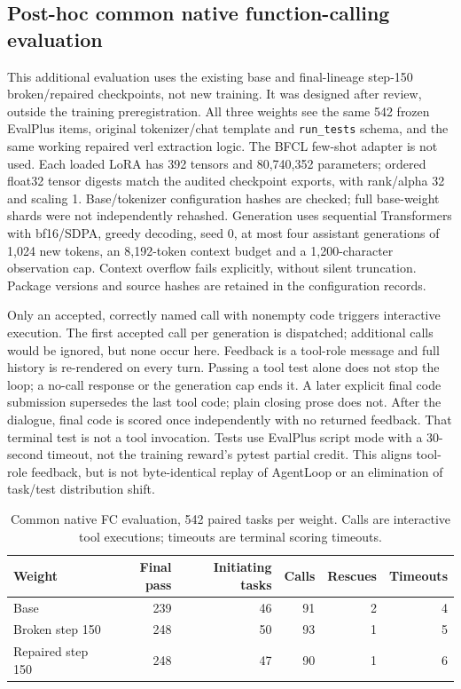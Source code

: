 \subsection{Post-hoc common native function-calling evaluation}
\label{app:nativefc}

This additional evaluation uses the existing base and final-lineage step-150
broken/repaired checkpoints, not new training. It was designed after review, outside
the training preregistration. All three weights see the same 542 frozen EvalPlus
items, original tokenizer/chat template and \texttt{run\_tests} schema, and the same
working repaired verl extraction logic. The BFCL few-shot adapter is not used.
Each loaded LoRA has 392 tensors and 80,740,352 parameters; ordered float32 tensor
digests match the audited checkpoint exports, with rank/alpha 32 and scaling 1.
Base/tokenizer configuration hashes are checked; full base-weight shards were not
independently rehashed. Generation uses sequential Transformers with bf16/SDPA,
greedy decoding, seed 0, at most four assistant generations of 1,024 new tokens,
an 8,192-token context budget and a 1,200-character observation cap. Context overflow
fails explicitly, without silent truncation. Package versions and source hashes
are retained in the configuration records.

Only an accepted, correctly named call with nonempty code triggers interactive
execution. The first accepted call per generation is dispatched; additional calls
would be ignored, but none occur here. Feedback is a tool-role message and full
history is re-rendered on every turn. Passing a tool test alone does not stop the
loop; a no-call response or the generation cap ends it. A later explicit final
code submission supersedes the last tool code; plain closing prose does not.
After the dialogue, final code is scored once independently with no returned
feedback. That terminal test is not a tool invocation. Tests use EvalPlus script
mode with a 30-second timeout, not the training reward's pytest partial credit.
This aligns tool-role feedback, but is not byte-identical replay of AgentLoop or
an elimination of task/test distribution shift.

\begin{table}[htbp]
\centering
\caption{Common native FC evaluation, 542 paired tasks per weight. Calls are
interactive tool executions; timeouts are terminal scoring timeouts.}
\label{tab:nativefc}
\small
\begin{tabular}{lrrrrr}
\toprule
Weight & Final pass & Initiating tasks & Calls & Rescues & Timeouts \\
\midrule
Base & 239 & 46 & 91 & 2 & 4 \\
Broken step 150 & 248 & 50 & 93 & 1 & 5 \\
Repaired step 150 & 248 & 47 & 90 & 1 & 6 \\
\bottomrule
\end{tabular}
\end{table}

